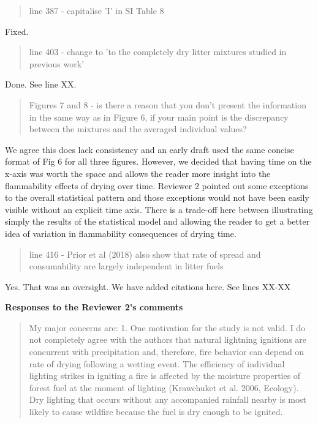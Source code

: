 \documentclass[letterpaper, 12pt]{letter}
\begin{document}
\begin{letter}{}
\begin{quote}
line 387 - capitalise 'I' in SI Table  8
\end{quote}

Fixed.

\begin{quote}
line 403 - change to 'to the completely dry litter mixtures studied in previous work'
\end{quote}

Done. See line XX.


\begin{quote}
Figures 7 and 8 - is there a reason that you don't present the information in the same way as in Figure 6, if your main point is the discrepancy between the mixtures and the averaged individual values?
\end{quote}

We agree this does lack consistency and an early draft used the same concise format of Fig 6 for all three figures. However, we decided that having time on the x-axis was worth the space and allows the reader more insight into the flammability effects of drying over time. Reviewer 2 pointed out some exceptions to the overall statistical pattern and those exceptions would not have been easily visible without an explicit time axis. There is a trade-off here between illustrating simply the results of the statistical model and allowing the reader to get a better idea of variation in flammability consequences of drying time.

\begin{quote}
line 416 - Prior et al (2018) also show that rate of spread and consumability are largely independent in litter fuels
\end{quote}

Yes. That was an oversight. We have added citations here. See lines XX-XX

{\bf Responses to the Reviewer 2's comments}

\begin{quote}

My major concerns are:
1. One motivation for the study is not valid. I do not completely agree with the authors that natural lightning ignitions are concurrent with precipitation and, therefore, fire behavior can depend on rate of drying following a wetting event. The efficiency of individual lighting strikes in igniting a fire is affected by the moisture properties of forest fuel at the moment of lighting (Krawchuket et al. 2006, Ecology). Dry lighting that occurs without any accompanied rainfall nearby is most likely to cause wildfire because the fuel is dry enough to be ignited.
\end{quote}


\end{letter}
\end{document}

